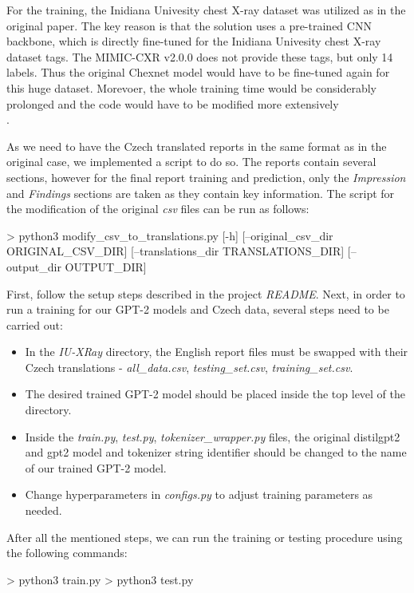 For the training, the Inidiana Univesity chest X-ray dataset was utilized as in the original paper. The key reason is that the solution uses a pre-trained CNN backbone, which is directly fine-tuned for the Inidiana Univesity chest X-ray dataset tags. The MIMIC-CXR v2.0.0 does not provide these tags, but only 14 labels. Thus the original Chexnet model would have to be fine-tuned again for this huge dataset. Morevoer, the whole training time would be considerably prolonged and the code would have to be modified more extensively\\.
 
As we need to have the Czech translated reports in the same format as in the original case, we implemented a script to do so. The reports contain several sections, however for the final report training and prediction, only the \textit{Impression} and \textit{Findings} sections are taken as they contain key information. The script for the modification of the original \textit{csv} files can be run as follows:
\begin{code}
> python3 modify_csv_to_translations.py [-h] 
                                [--original_csv_dir ORIGINAL_CSV_DIR] 
                                [--translations_dir TRANSLATIONS_DIR]
                                [--output_dir OUTPUT_DIR]
\end{code}

First, follow the setup steps described in the project \textit{README}. Next, in order to run a training for our GPT-2 models and Czech data, several steps need to be carried out:
\begin{itemize}
	\item In the \textit{IU-XRay} directory, the English report files must be swapped with their Czech translations - \textit{all\_data.csv}, \textit{testing\_set.csv}, \textit{training\_set.csv}.
	\item The desired trained GPT-2 model should be placed inside the top level of the directory.
	\item Inside the \textit{train.py}, \textit{test.py}, \textit{tokenizer\_wrapper.py} files, the original distilgpt2 and gpt2 model and tokenizer string identifier should be changed to the name of our trained GPT-2 model.
	\item Change hyperparameters in \textit{configs.py} to adjust training parameters as needed.
\end{itemize}

After all the mentioned steps, we can run the training or testing procedure using the following commands:
\begin{code}
> python3 train.py
> python3 test.py
\end{code}

